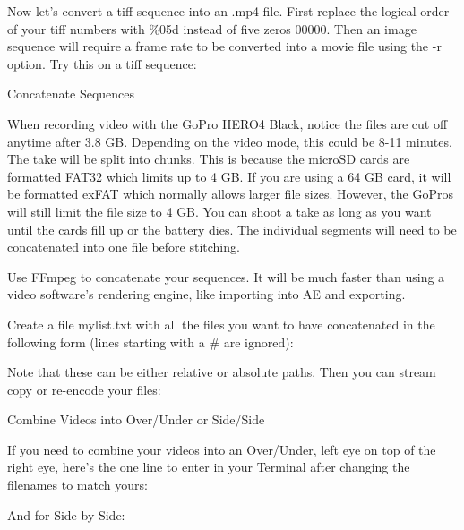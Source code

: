 \begin{fullwidth}
Now let’s convert a tiff sequence into an .mp4 file. First replace the logical order of your tiff numbers with \%05d instead of five zeros 00000. Then an image sequence will require a frame rate to be converted into a movie file using the -r option. Try this on a tiff sequence:


{\large Concatenate Sequences \par}

When recording video with the GoPro HERO4 Black, notice the files are cut off anytime after 3.8 GB. Depending on the video mode, this could be 8-11 minutes. The take will be split into chunks. This is because the microSD cards are formatted FAT32 which limits up to 4 GB. If you are using a 64 GB card, it will be formatted exFAT which normally allows larger file sizes. However, the GoPros will still limit the file size to 4 GB. You can shoot a take as long as you want until the cards fill up or the battery dies. The individual segments will need to be concatenated into one file before stitching.

Use FFmpeg to concatenate your sequences. It will be much faster than using a video software’s rendering engine, like importing into AE and exporting.

Create a file mylist.txt with all the files you want to have concatenated in the following form (lines starting with a # are ignored):


Note that these can be either relative or absolute paths. Then you can stream copy or re-encode your files:


{\large Combine Videos into Over/Under or Side/Side \par}

If you need to combine your videos into an Over/Under, left eye on top of the right eye, here’s the one line to enter in your Terminal after changing the filenames to match yours:


And for Side by Side:




\end{fullwidth}
